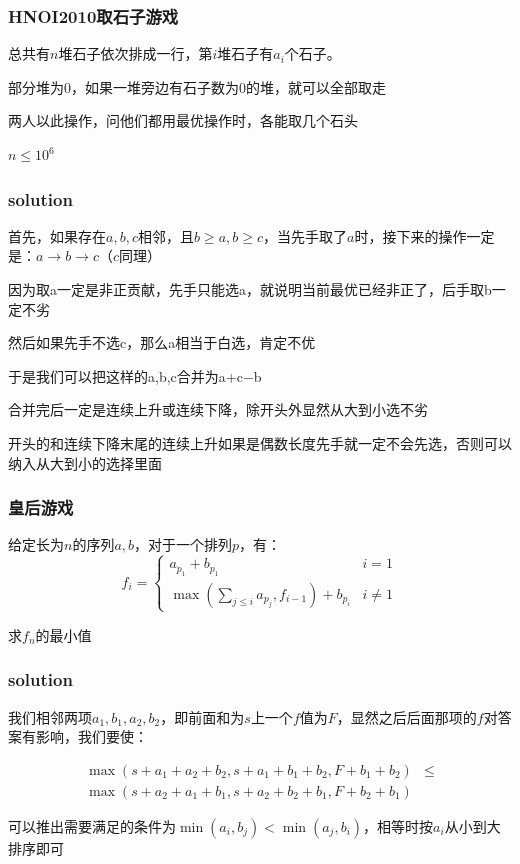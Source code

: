 \documentclass[10pt]{beamer}
\begin{document}
	\clearpage
	\begin{frame}
		\frametitle{HNOI2010取石子游戏}
		\par 总共有$n$堆石子依次排成一行，第$i$堆石子有$a_i$个石子。
		\par 部分堆为$0$，如果一堆旁边有石子数为$0$的堆，就可以全部取走
		\par 两人以此操作，问他们都用最优操作时，各能取几个石头
		\par $n\le 10^6$
	\end{frame}
	\clearpage
	\begin{frame}
		\frametitle{solution}
		 首先，如果存在$a,b,c$相邻，且$b\ge a,b\ge c$，当先手取了$a$时，接下来的操作一定是：$a\rightarrow b\rightarrow c$（$c$同理）

		 因为取a一定是非正贡献，先手只能选a，就说明当前最优已经非正了，后手取b一定不劣

		 然后如果先手不选c，那么a相当于白选，肯定不优

		 于是我们可以把这样的a,b,c合并为a+c−b

		 合并完后一定是连续上升或连续下降，除开头外显然从大到小选不劣

		 开头的和连续下降末尾的连续上升如果是偶数长度先手就一定不会先选，否则可以纳入从大到小的选择里面

	\end{frame}
	\clearpage
	\begin{frame}
		\frametitle{皇后游戏}
		\par 给定长为$n$的序列$a,b$，对于一个排列$p$，有：
		$$
		f_i=\begin{cases}a_{p_1}+b_{p_1}&i=1\\\max(\sum_{j\le i} a_{p_j},f_{i-1})+b_{p_i}&i\not =1\end{cases}
		$$
		\par 求$f_n$的最小值
	\end{frame}
	\clearpage
	\begin{frame}
		\frametitle{solution}
		 我们相邻两项$a_1,b_1,a_2,b_2$，即前面和为$s$上一个$f$值为$F$，显然之后后面那项的$f$对答案有影响，我们要使：

		\onslide<2-> $$
		\begin{aligned}
			\max(s+a_1+a_2+b_2,s+a_1+b_1+b_2,F+b_1+b_2)&\le\\
			\max(s+a_2+a_1+b_1,s+a_2+b_2+b_1,F+b_2+b_1)&
		\end{aligned}
		$$

		 可以推出需要满足的条件为$\min(a_i,b_j)<\min(a_j,b_i)$，相等时按$a_i$从小到大排序即可
		
	\end{frame}
\end{document}
